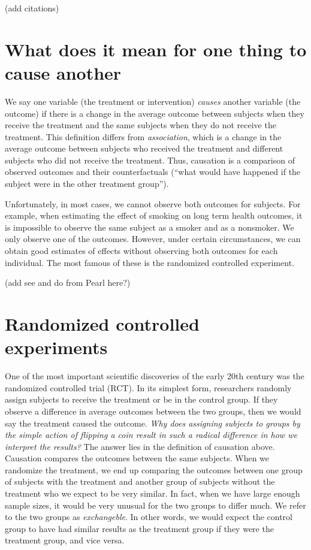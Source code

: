 \documentclass[
]{book}
\begin{document}
(add citations)

\hypertarget{what-does-it-mean-for-one-thing-to-cause-another}{%
\section{What does it mean for one thing to cause another}\label{what-does-it-mean-for-one-thing-to-cause-another}}

We say one variable (the treatment or intervention) \emph{causes} another variable (the outcome) if there is a change in the average outcome between subjects when they receive the treatment and the same subjects when they do not receive the treatment. This definition differs from \emph{association}, which is a change in the average outcome between subjects who received the treatment and different subjects who did not receive the treatment. Thus, causation is a comparison of observed outcomes and their counterfactuals (``what would have happened if the subject were in the other treatment group'').

Unfortunately, in most cases, we cannot observe both outcomes for subjects. For example, when estimating the effect of smoking on long term health outcomes, it is impossible to observe the same subject as a smoker and as a nonsmoker. We only observe one of the outcomes. However, under certain circumstances, we can obtain good estimates of effects without observing both outcomes for each individual. The most famous of these is the randomized controlled experiment.

(add see and do from Pearl here?)

\hypertarget{randomized-controlled-experiments}{%
\section{Randomized controlled experiments}\label{randomized-controlled-experiments}}

One of the most important scientific discoveries of the early 20th century was the randomized controlled trial (RCT). In its simplest form, researchers randomly assign subjects to receive the treatment or be in the control group. If they observe a difference in average outcomes between the two groups, then we would say the treatment caused the outcome. \emph{Why does assigning subjects to groups by the simple action of flipping a coin result in such a radical difference in how we interpret the results?} The answer lies in the definition of causation above. Causation compares the outcomes between the same subjects. When we randomize the treatment, we end up comparing the outcomes between one group of subjects with the treatment and another group of subjects without the treatment who we expect to be very similar. In fact, when we have large enough sample sizes, it would be very unusual for the two groups to differ much. We refer to the two groups as \emph{exchangeble}. In other words, we would expect the control group to have had similar results as the treatment group if they were the treatment group, and vice versa.
\end{document}
